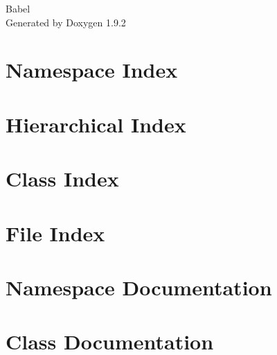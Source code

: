 \documentclass[twoside]{book}
\newcommand{\+}{\discretionary{\mbox{\scriptsize$\hookleftarrow$}}{}{}}
\newcommand{\clearemptydoublepage}{%
    \newpage{\pagestyle{empty}\cleardoublepage}%
  }
\begin{document}
  \raggedbottom
    \hypersetup{pageanchor=false,
                bookmarksnumbered=true,
                pdfencoding=unicode
               }
  \begin{titlepage}
  \vspace*{7cm}
  \begin{center}%
  {\Large Babel}\\
  \vspace*{1cm}
  {\large Generated by Doxygen 1.9.2}\\
  \end{center}
  \end{titlepage}
  \clearemptydoublepage
  \tableofcontents
  \clearemptydoublepage
  \hypersetup{pageanchor=true}
\chapter{Namespace Index}

\chapter{Hierarchical Index}

\chapter{Class Index}

\chapter{File Index}

\chapter{Namespace Documentation}

\chapter{Class Documentation}
































\end{document}
